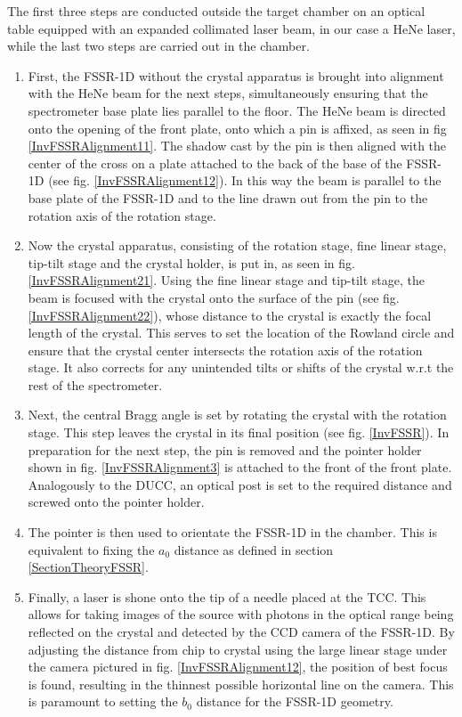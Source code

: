 The first three steps are conducted outside the target chamber on an optical 
table equipped with an expanded collimated laser beam, in our case a 
HeNe laser, while the last two steps are carried out in 
the chamber.

\begin{enumerate}
	\item First, the FSSR-1D without the crystal apparatus is brought into 
	alignment with the HeNe beam for the next steps, simultaneously ensuring 
	that the spectrometer 
	base plate lies parallel to the floor. The HeNe beam is directed onto the 
	opening of the front plate, onto which a pin is affixed, as seen in 
	fig \ref{InvFSSRAlignment11}. The shadow cast by the pin is then 
	aligned with the center of 
	the cross on a plate attached to the back of the base of the 
	FSSR-1D (see fig. \ref{InvFSSRAlignment12}). In this way the beam 
	is parallel to the base plate of the FSSR-1D and to the line drawn 
	out from the pin to the rotation axis of the rotation stage.
	\item Now the crystal apparatus, consisting of the rotation stage, 
	fine linear stage, tip-tilt stage and the crystal holder, is put 
	in, as seen in fig. \ref{InvFSSRAlignment21}. Using the fine linear 
	stage and tip-tilt stage, the beam is 
	focused with the crystal onto the 
	surface of the pin (see fig. \ref{InvFSSRAlignment22}), whose 
	distance to the crystal is exactly the 
	focal length of the crystal. This 
	serves to set the location of the Rowland circle 
	and ensure that the crystal center intersects the rotation axis of 
	the rotation stage. It also corrects for any unintended tilts or 
	shifts of the crystal w.r.t the rest of the spectrometer. 
	\item Next, the central Bragg angle is set by rotating the crystal 
	with the rotation stage. This step leaves the crystal in its final 
	position (see fig. \ref{InvFSSR}). In preparation for the next 
	step, the pin is removed 
	and the pointer holder shown in fig. \ref{InvFSSRAlignment3} is 
	attached to the front of the front plate. Analogously to the DUCC, 
	an optical post is set to the required distance and screwed onto 
	the pointer holder.
	\item The pointer is then used to orientate the FSSR-1D in the 
	chamber. This is equivalent to fixing the $a_0$ 
	distance as defined in section \ref{SectionTheoryFSSR}.
	\item Finally, a laser is shone onto the tip of a needle placed at 
	the TCC. This 
	allows for taking images of the source with photons in the optical 
	range being reflected on the crystal and detected by the CCD camera 
	of the FSSR-1D. By adjusting the distance from chip to 
	crystal using the large linear stage under the camera pictured in 
	fig. \ref{InvFSSRAlignment12}, the position of best focus is found, 
	resulting in the thinnest possible horizontal line on the camera. 
	This is paramount to setting the 
	$b_0$ distance for the FSSR-1D geometry.
\end{enumerate}

